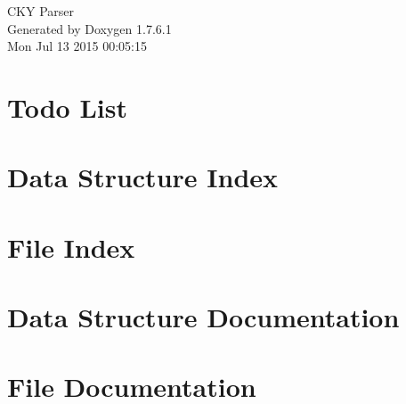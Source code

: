 \documentclass[a4paper]{book}
\begin{document}
\hypersetup{pageanchor=false,citecolor=blue}
\begin{titlepage}
\vspace*{7cm}
\begin{center}
{\Large \-C\-K\-Y \-Parser }\\
\vspace*{1cm}
{\large \-Generated by Doxygen 1.7.6.1}\\
\vspace*{0.5cm}
{\small Mon Jul 13 2015 00:05:15}\\
\end{center}
\end{titlepage}
\clearemptydoublepage
{}
\tableofcontents
\clearemptydoublepage
{}
\hypersetup{pageanchor=true,citecolor=blue}
\chapter{\-Todo \-List}
\label{todo}
\hypertarget{todo}{}

\chapter{\-Data \-Structure \-Index}

\chapter{\-File \-Index}

\chapter{\-Data \-Structure \-Documentation}










\chapter{\-File \-Documentation}






















\printindex
\end{document}
